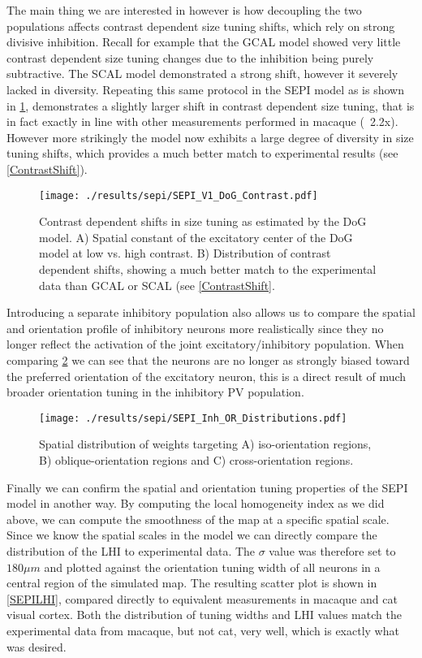 The main thing we are interested in however is how decoupling the two
populations affects contrast dependent size tuning shifts, which rely
on strong divisive inhibition. Recall for example that the GCAL model
showed very little contrast dependent size tuning changes due to the
inhibition being purely subtractive. The SCAL model demonstrated a
strong shift, however it severely lacked in diversity. Repeating this
same protocol in the SEPI model as is shown in
\ref{SEPI_DoG_Contrast}, demonstrates a slightly larger shift in
contrast dependent size tuning, that is in fact exactly in line with
other measurements performed in macaque (~2.2x). However more
strikingly the model now exhibits a large degree of diversity in size
tuning shifts, which provides a much better match to experimental
results (see \ref{ContrastShift}).

\begin{figure}
	\centering
        \texttt{[image: ./results/sepi/SEPI\_V1\_DoG\_Contrast.pdf]}
	\caption{Contrast dependent shifts in size tuning as estimated by
      the DoG model. A) Spatial constant of the excitatory center of
      the DoG model at low vs. high contrast. B) Distribution of
      contrast dependent shifts, showing a much better match to the
      experimental data than GCAL or SCAL (see \ref{ContrastShift}.}
	\label{SEPI_DoG_Contrast}
\end{figure}

Introducing a separate inhibitory population also allows us to compare
the spatial and orientation profile of inhibitory neurons more
realistically since they no longer reflect the activation of the joint
excitatory/inhibitory population. When comparing
\ref{SEPI_OR_Distributions} we can see that the neurons are no longer
as strongly biased toward the preferred orientation of the excitatory
neuron, this is a direct result of much broader orientation tuning in
the inhibitory PV population.

\begin{figure}
	\centering
        \texttt{[image: ./results/sepi/SEPI\_Inh\_OR\_Distributions.pdf]}
	\caption{Spatial distribution of weights targeting A)
      iso-orientation regions, B) oblique-orientation regions and C)
      cross-orientation regions.}
	\label{SEPI_OR_Distributions}
\end{figure}

Finally we can confirm the spatial and orientation tuning properties
of the SEPI model in another way. By computing the local homogeneity
index as we did above, we can compute the smoothness of the map at a
specific spatial scale. Since we know the spatial scales in the model
we can directly compare the distribution of the LHI to experimental
data. The $\sigma$ value was therefore set to $180 \mu m$ and plotted
against the orientation tuning width of all neurons in a central
region of the simulated map. The resulting scatter plot is shown in
\ref{SEPILHI}, compared directly to equivalent measurements in macaque
and cat visual cortex. Both the distribution of tuning widths and LHI
values match the experimental data from macaque, but not cat, very
well, which is exactly what was desired.


